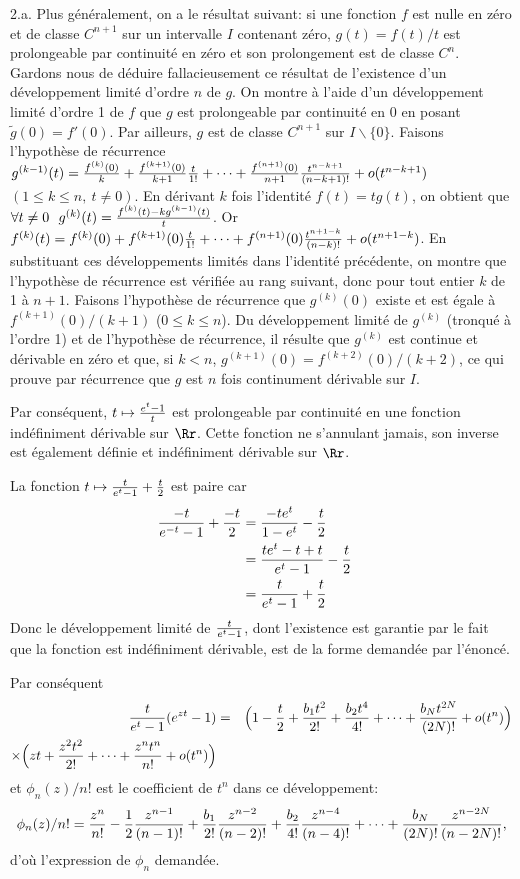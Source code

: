 {\begin{enumerate}
{\medskip
2.a. Plus généralement, on a le résultat suivant: si une fonction $f$ est nulle
en zéro et de classe $C^{n+1}$ sur un intervalle $I$ contenant zéro, $g(t)=f(t)/t$ est
prolongeable par continuité en zéro et son prolongement est de classe $C^n$.
Gardons nous de déduire fallacieusement ce résultat de l'existence d'un développement
limité d'ordre $n$ de $g$.
On montre à l'aide d'un développement limité d'ordre 1 de $f$ que $g$ est
prolongeable par continuité en $0$ en posant $\tilde g(0)=f'(0)$. Par ailleurs, $g$ est de
classe $C^{n+1}$ sur $I\backslash\{0\}$. 
Faisons l'hypothèse de
récurrence $g^{(k-1)}(t)={f^{(k)}(0) \over k} + {f^{(k+1)}(0) \over k+1} {t \over 1!}
+ \dots + {f^{(n+1)}(0) \over n+1} {t^{n-k+1} \over (n-k+1)!}+o(t^{n-k+1})$
$(1\leq k \leq n,\ t\neq0)$.
En dérivant $k$ fois l'identité $f(t)=tg(t)$, on obtient que
$\forall t\neq0 \ \ g^{(k)}(t)={ f^{(k)}(t) - k g^{(k-1)}(t) \over t }$.
Or $f^{(k)}(t)=f^{(k)}(0)+f^{(k+1)}(0){t\over1!}+\dots
+f^{(n+1)}(0){t^{n+1-k}\over(n-k)!}+o(t^{n+1-k})$.
En substituant ces développements limités dans l'identité précédente, on montre que
l'hypothèse de récurrence est vérifiée au rang suivant, donc pour tout entier
$k$ de 1 à $n+1$.
 Faisons l'hypothèse de récurrence que $g^{(k)}(0)$ existe
et est égale à $f^{(k+1)}(0)/(k+1)$ ($0\leq k\leq n$). Du développement limité
de $g^{(k)}$ (tronqué à l'ordre 1) et de l'hypothèse de
récurrence, il résulte que $g^{(k)}$ est continue et dérivable en zéro et que, si
$k<n$, $g^{(k+1)}(0)=f^{(k+2)}(0)/(k+2)$, ce qui prouve par récurrence que $g$ est
$n$ fois continument dérivable sur $I$.

Par conséquent, $t\mapsto{e^t-1 \over t}$ est prolongeable par continuité en une
fonction indéfiniment dérivable sur $\Rr$. Cette fonction ne s'annulant jamais,
son inverse est également définie et indéfiniment dérivable sur $\Rr$.



La fonction $t \mapsto {t \over e^t-1} + {t\over2}$ est paire car
$$\begin{aligned}
{-t \over e^{-t}-1} + {-t\over2}
&= {-t e^t \over 1-e^t} - {t\over2}  \cr
&= {t e^t - t + t \over e^t-1} - {t\over2}  \cr
&= {t \over e^t-1} + {t\over2}  \cr
\end{aligned}
$$
Donc  le développement limité de ${t \over e^t-1}$, dont l'existence est garantie par
le fait que la fonction est indéfiniment dérivable, est de la forme demandée par
l'énoncé.

Par conséquent
\begin{eqnarray*}
{t \over e^t-1} (e^{zt}-1) &=&
\Big( 1-{t\over2}+ {b_1 t^2 \over 2!} + {b_2 t^4 \over 4!} + \dots 
+  {b_N t^{2N} \over (2N)!} + o(t^n) \Big) 
\\
\times \Big( zt + {z^2 t^2 \over 2!} + \dots + {z^n t^n \over n!} + o(t^n)   \Big)   
 \end{eqnarray*}
et $\phi_n(z)/n!$ est le coefficient de $t^n$ dans ce développement:
$$\phi_n(z)/n!= {z^n\over n!} - {1\over2} {z^{n-1}\over(n-1)!}
+ {b_1\over2!}{z^{n-2}\over(n-2)!} + {b_2\over4!}{z^{n-4}\over(n-4)!}
+ \dots + {b_N\over(2N)!}{z^{n-2N}\over(n-2N)!},$$
d'où l'expression de $\phi_n$ demandée.

}
\end{enumerate}}

